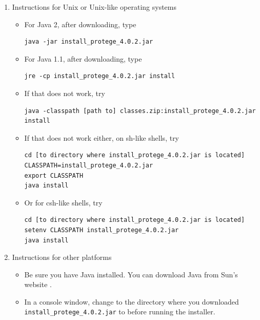 \begin{enumerate}
    \setlength{\itemsep}{0cm}
    \setlength{\parskip}{0cm}

    \item Instructions for Unix or Unix-like operating systems
    \begin{itemize}
        \setlength{\itemsep}{0cm}
        \setlength{\parskip}{0cm}

        \item For Java 2, after downloading, type
\begin{verbatim}
java -jar install_protege_4.0.2.jar
\end{verbatim}
        \item For Java 1.1, after downloading, type
\begin{verbatim}
jre -cp install_protege_4.0.2.jar install
\end{verbatim}
        \item If that does not work, try
\begin{verbatim}
java -classpath [path to] classes.zip:install_protege_4.0.2.jar install
\end{verbatim}
        \item If that does not work either, on sh-like shells, try
\begin{verbatim}
cd [to directory where install_protege_4.0.2.jar is located]
CLASSPATH=install_protege_4.0.2.jar
export CLASSPATH
java install
\end{verbatim}
        \item Or for csh-like shells, try
\begin{verbatim}
cd [to directory where install_protege_4.0.2.jar is located]
setenv CLASSPATH install_protege_4.0.2.jar
java install
\end{verbatim}
    \end{itemize}
    \item Instructions for other platforms
    \begin{itemize}
        \setlength{\itemsep}{0cm}
        \setlength{\parskip}{0cm}

        \item Be sure you have Java installed. You can download Java from Sun's website \cite{SunHome}.
        \item In a console window, change to the directory where you downloaded \texttt{install\_protege\_4.0.2.jar} to before running the installer.
    \end{itemize}
\end{enumerate}

